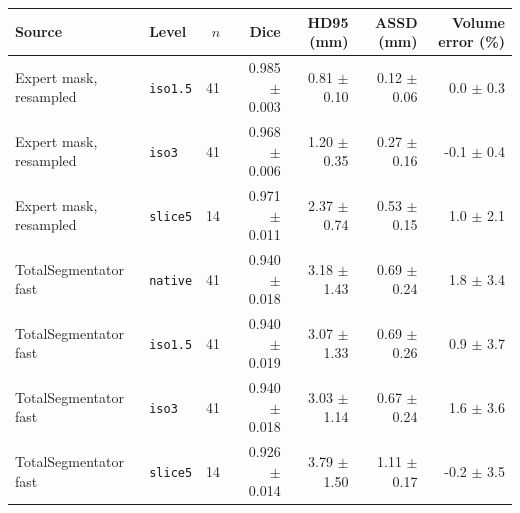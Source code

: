 \begin{tabular}{llrrrrr}
\toprule
Source & Level & $n$ & Dice & HD95 (mm) & ASSD (mm) & Volume error (\%) \\
\midrule
Expert mask, resampled & \texttt{iso1.5} & 41 & 0.985 $\pm$ 0.003 & 0.81 $\pm$ 0.10 & 0.12 $\pm$ 0.06 & 0.0 $\pm$ 0.3 \\
Expert mask, resampled & \texttt{iso3} & 41 & 0.968 $\pm$ 0.006 & 1.20 $\pm$ 0.35 & 0.27 $\pm$ 0.16 & -0.1 $\pm$ 0.4 \\
Expert mask, resampled & \texttt{slice5} & 14 & 0.971 $\pm$ 0.011 & 2.37 $\pm$ 0.74 & 0.53 $\pm$ 0.15 & 1.0 $\pm$ 2.1 \\
\midrule
TotalSegmentator fast & \texttt{native} & 41 & 0.940 $\pm$ 0.018 & 3.18 $\pm$ 1.43 & 0.69 $\pm$ 0.24 & 1.8 $\pm$ 3.4 \\
TotalSegmentator fast & \texttt{iso1.5} & 41 & 0.940 $\pm$ 0.019 & 3.07 $\pm$ 1.33 & 0.69 $\pm$ 0.26 & 0.9 $\pm$ 3.7 \\
TotalSegmentator fast & \texttt{iso3} & 41 & 0.940 $\pm$ 0.018 & 3.03 $\pm$ 1.14 & 0.67 $\pm$ 0.24 & 1.6 $\pm$ 3.6 \\
TotalSegmentator fast & \texttt{slice5} & 14 & 0.926 $\pm$ 0.014 & 3.79 $\pm$ 1.50 & 1.11 $\pm$ 0.17 & -0.2 $\pm$ 3.5 \\
\bottomrule
\end{tabular}
